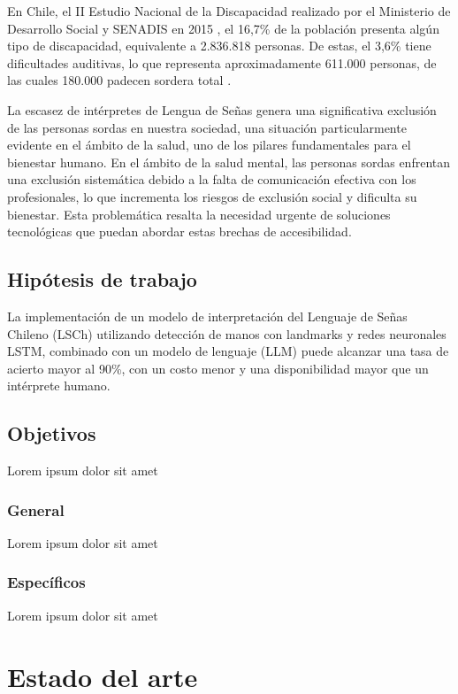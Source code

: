 \documentclass{article}
\begin{document}
En Chile, el II Estudio Nacional de la Discapacidad realizado por el Ministerio de Desarrollo Social y SENADIS en 2015 \cite{cita12}, el 16,7\% de la población presenta algún tipo de discapacidad, equivalente a 2.836.818 personas. De estas, el 3,6\% tiene dificultades auditivas, lo que representa aproximadamente 611.000 personas, de las cuales 180.000 padecen sordera total \cite{cita1}.

La escasez de intérpretes de Lengua de Señas genera una significativa exclusión de las personas sordas en nuestra sociedad, una situación particularmente evidente en el ámbito de la salud, uno de los pilares fundamentales para el bienestar humano.
En el ámbito de la salud mental, las personas sordas enfrentan una exclusión sistemática debido a la falta de comunicación efectiva con los profesionales, lo que incrementa los riesgos de exclusión social y dificulta su bienestar. Esta problemática resalta la necesidad urgente de soluciones tecnológicas que puedan abordar estas brechas de accesibilidad.

\subsection{Hipótesis de trabajo}

La implementación de un modelo de interpretación del Lenguaje de Señas Chileno (LSCh)
utilizando detección de manos con landmarks y redes neuronales LSTM, combinado con un
modelo de lenguaje (LLM) puede alcanzar una tasa de acierto mayor al 90\%, con un costo menor y una disponibilidad mayor que un intérprete humano.

\subsection{Objetivos}

Lorem ipsum dolor sit amet

\subsubsection{General}

Lorem ipsum dolor sit amet

\subsubsection{Específicos}

Lorem ipsum dolor sit amet

\section{Estado del arte}
\end{document}
